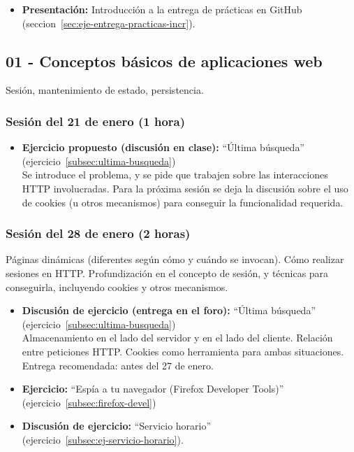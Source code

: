 \documentclass[a4paper,12pt]{article}
\begin{document}
\begin{itemize}
\item \textbf{Presentación:} Introducción a la entrega de prácticas en GitHub (seccion~\ref{sec:eje-entrega-practicas-incr}).
\end{itemize}
  
\subsection{01 - Conceptos básicos de aplicaciones web}

Sesión, mantenimiento de estado, persistencia.

\subsubsection{Sesión del 21 de enero (1 hora)}

\begin{itemize}
\item \textbf{Ejercicio propuesto (discusión en clase):} ``Última búsqueda'' (ejercicio~\ref{subsec:ultima-busqueda}) \\
  Se introduce el problema, y se pide que trabajen sobre las interacciones HTTP involucradas. Para la próxima sesión se deja la discusión sobre el uso de cookies (u otros mecanismos) para conseguir la funcionalidad requerida.
\end{itemize}

\subsubsection{Sesión del 28 de enero (2 horas)}

Páginas dinámicas (diferentes según cómo y cuándo se invocan). Cómo realizar sesiones en HTTP. Profundización en el concepto de sesión, y técnicas para conseguirla, incluyendo cookies y otros mecanismos.

\begin{itemize}
\item \textbf{Discusión de ejercicio (entrega en el foro):} ``Última búsqueda'' (ejercicio~\ref{subsec:ultima-busqueda}) \\
  Almacenamiento en el lado del servidor y en el lado del cliente. Relación entre peticiones HTTP. Cookies como herramienta para ambas situaciones.\\
  Entrega recomendada: antes del 27 de enero.
\item \textbf{Ejercicio:} ``Espía a tu navegador (Firefox Developer Tools)'' (ejercicio~\ref{subsec:firefox-devel})
\item \textbf{Discusión de ejercicio:} ``Servicio horario'' \\
  (ejercicio~\ref{subsec:ej-servicio-horario}).
\end{itemize}
\end{document}
